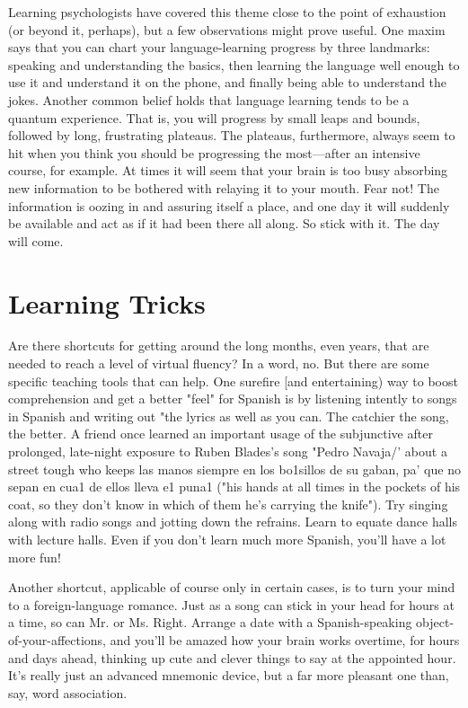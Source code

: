 Learning psychologists have covered this theme close to the
point of exhaustion (or beyond it, perhaps), but a few observations
might prove useful. One maxim says that you can chart your language-learning progress by three landmarks: speaking and understanding the
basics, then learning the language well enough to use it and understand it on the phone, and finally being able to understand the jokes.
Another common belief holds that language learning tends to be a
quantum experience. That is, you will progress by small leaps and
bounds, followed by long, frustrating plateaus. The plateaus, furthermore, always seem to hit when you think you should be progressing
the most---after an intensive course, for example. At times it will
seem that your brain is too busy absorbing new information to be
bothered with relaying it to your mouth. Fear not! The information is
oozing in and assuring itself a place, and one day it will suddenly be
available and act as if it had been there all along. So stick with it. The
day will come.

\section{Learning Tricks}

Are there shortcuts for getting around the long months, even
years, that are needed to reach a level of virtual fluency? In a word, no.
But there are some specific teaching tools that can help. One surefire
[and entertaining) way to boost comprehension and get a better "feel"
for Spanish is by listening intently to songs in Spanish and writing out
"the lyrics as well as you can. The catchier the song, the better. A friend
once learned an important usage of the subjunctive after prolonged,
late-night exposure to Ruben Blades's song "Pedro Navaja/' about a
street tough who keeps las manos siempre en los bo1sillos de su gaban, pa' que no sepan en cua1 de ellos lleva e1 puna1 ("his hands at all
times in the pockets of his coat, so they don't know in which of them
he's carrying the knife"). Try singing along with radio songs and jotting
down the refrains. Learn to equate dance halls with lecture halls. Even
if you don't learn much more Spanish, you'll have a lot more fun!

Another shortcut, applicable of course only in certain cases, is
to turn your mind to a foreign-language romance. Just as a song can
stick in your head for hours at a time, so can Mr. or Ms. Right. Arrange
a date with a Spanish-speaking object-of-your-affections, and you'll be
amazed how your brain works overtime, for hours and days ahead,
thinking up cute and clever things to say at the appointed hour. It's
really just an advanced mnemonic device, but a far more pleasant one
than, say, word association.

